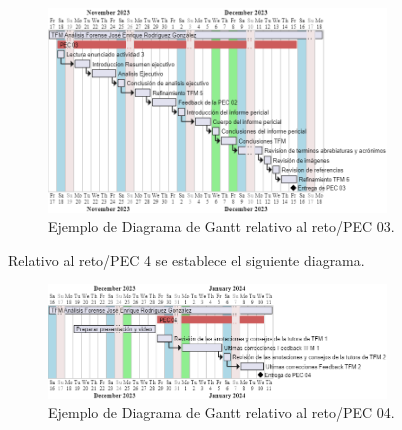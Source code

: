 \begin{figure}[htp]
    \centering
    \includegraphics[width=0.8\textwidth]{imagenes/005-diagrama-de-gantt-pec-03.png}
    \caption{Ejemplo de Diagrama de Gantt relativo al reto/PEC 03.}
    \label{fig:Diagrama de Gantt PEC 3}
\end{figure}


\clearpage

\noindent Relativo al reto/PEC 4 se establece el siguiente diagrama.

\begin{figure}[htp]
    \centering
    \includegraphics[width=0.8\textwidth]{imagenes/006-diagrama-de-gantt-pec-04.png}
    \caption{Ejemplo de Diagrama de Gantt relativo al reto/PEC 04.}
    \label{fig:Diagrama de Gantt PEC 4}
\end{figure}

